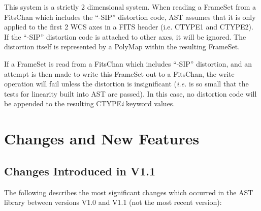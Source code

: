 \documentclass[twoside,11pt]{article}
\newcommand{\xlabel}[1]{}
\begin{document}
This system is a strictly 2 dimensional system. When reading a
FrameSet from a FitsChan which 
includes the ``-SIP'' distortion code, AST assumes that it
is only applied to the first 2 WCS axes in a FITS header (i.e.
CTYPE1 and CTYPE2). If the ``-SIP'' distortion code is attached to other
axes, it will be ignored. The distortion itself is represented by a
PolyMap within the resulting FrameSet.

If a FrameSet is read from a FitsChan which includes ``-SIP''
distortion, and an attempt is then made to write this FrameSet out to a
FitsChan, the write operation will fail unless the distortion is
insignificant (\emph{i.e.} is so small that the tests for linearity built
into AST are passed). In this case, no distortion code will be appended to 
the resulting CTYPE\emph{i} keyword values.

\newpage
\section{\xlabel{changes_and_new_features}\label{ss:changes}Changes and New Features}

\subsection{Changes Introduced in V1.1}

The following describes the most significant changes which occurred in
the AST library between versions V1.0 and V1.1 (not the most recent
version):
\end{document}
